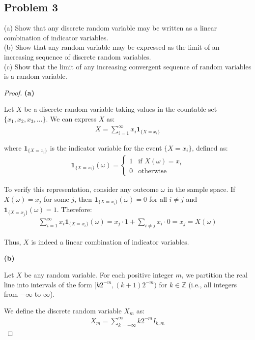 \documentclass[letterpaper, 11pt]{article}
\newcommand{\1}{\mathds{1}}	%
\theoremstyle{definition}
\begin{document}
\subsection*{Problem 3}
(a) Show that any discrete random variable may be written as a linear combination of indicator variables.
\\(b) Show that any random variable may be expressed as the limit of an increasing sequence of discrete random variables.
\\(c) Show that the limit of any increasing convergent sequence of random variables is a random variable.
\begin{proof}
    \textbf{(a)}

Let $X$ be a discrete random variable taking values in the countable set $\{x_1, x_2, x_3, \ldots\}$. We can express $X$ as:
\begin{align*}
X = \sum_{i=1}^{\infty} x_i \mathbf{1}_{\{X = x_i\}}
\end{align*}

where $\mathbf{1}_{\{X = x_i\}}$ is the indicator variable for the event $\{X = x_i\}$, defined as:
\begin{align*}
\mathbf{1}_{\{X = x_i\}}(\omega) = 
\begin{cases}
1 & \text{if } X(\omega) = x_i \\
0 & \text{otherwise}
\end{cases}
\end{align*}

To verify this representation, consider any outcome $\omega$ in the sample space. If $X(\omega) = x_j$ for some $j$, then $\mathbf{1}_{\{X = x_i\}}(\omega) = 0$ for all $i \neq j$ and $\mathbf{1}_{\{X = x_j\}}(\omega) = 1$. Therefore:
\begin{align*}
\sum_{i=1}^{\infty} x_i \mathbf{1}_{\{X = x_i\}}(\omega) = x_j \cdot 1 + \sum_{i \neq j} x_i \cdot 0 = x_j = X(\omega)
\end{align*}

Thus, $X$ is indeed a linear combination of indicator variables.

\textbf{(b)}

Let $X$ be any random variable. For each positive integer $m$, we partition the real line into intervals of the form $[k2^{-m}, (k+1)2^{-m})$ for $k \in \mathbb{Z}$ (i.e., all integers from $-\infty$ to $\infty$).

We define the discrete random variable $X_m$ as:
\begin{align*}
X_m = \sum_{k=-\infty}^{\infty} k2^{-m} I_{k,m}
\end{align*}


\end{proof}
\end{document}
